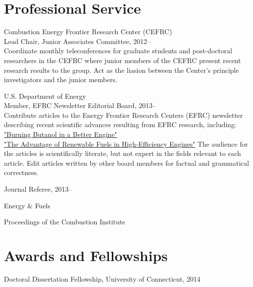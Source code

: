 \section{{\sectionfont Professional Service}}

Combustion Energy Frontier Research Center (CEFRC)\\
Lead Chair, Junior Associates Committee, 2012--\\
Coordinate monthly teleconferences for graduate students
and post-doctoral researchers in the CEFRC where junior members of
the CEFRC present recent research results to the group.
Act as the liasion between the Center's principle investigators
and the junior members.

\vspace{\baselineskip}

U.S. Department of Energy\\
Member, EFRC Newsletter Editorial Board, 2013--\\
Contribute articles to the Energy Frontier Research Centers (EFRC)
newsletter describing recent scientific advances resulting from 
EFRC research, including:\\
\href{http://www.energyfrontier.us/newsletter/201210/burning-butanol-better-engine}
{"Burning Butanol in a Better Engine"}\\
\href{http://www.energyfrontier.us/newsletter/201401/advantage-renewable-fuels-high-efficiency-engines}
{"The Advantage of Renewable Fuels in High-Efficiency Engines"}
The audience for the articles is scientifically literate, but not
expert in the fields relevant to each article. Edit articles written 
by other board members for factual and grammatical correctness.

\vspace{\baselineskip}

Journal Referee, 2013--
   \begin{innerlist}
       \item[] Energy \& Fuels
       \item[] Proceedings of the Combustion Institute
   \end{innerlist}

\vspace{0.5em}

\section{{\sectionfont Awards and Fellowships}}

Doctoral Dissertation Fellowship, University of Connecticut, 2014

